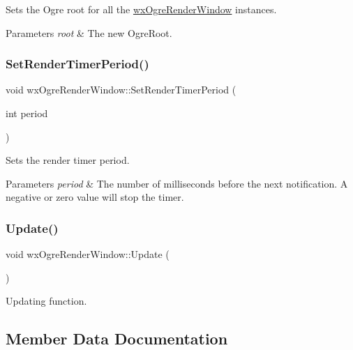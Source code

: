 Sets the Ogre root for all the \mbox{\hyperlink{classwx_ogre_render_window}{wx\+Ogre\+Render\+Window}} instances. 
\begin{DoxyParams}{Parameters}
{\em root} & The new Ogre\+Root. \\
\hline
\end{DoxyParams}
\mbox{\label{classwx_ogre_render_window_ad2588b1d44ae75bca36ede1303ff914f}} 
\subsubsection{\texorpdfstring{Set\+Render\+Timer\+Period()}{SetRenderTimerPeriod()}}
{\footnotesize\ttfamily void wx\+Ogre\+Render\+Window\+::\+Set\+Render\+Timer\+Period (\begin{DoxyParamCaption}\item[{int}]{period }\end{DoxyParamCaption})}

Sets the render timer period. 
\begin{DoxyParams}{Parameters}
{\em period} & The number of milliseconds before the next notification. A negative or zero value will stop the timer. \\
\hline
\end{DoxyParams}
\mbox{\label{classwx_ogre_render_window_a00c18e5b03975a630b512ebf0d4f0764}} 
\subsubsection{\texorpdfstring{Update()}{Update()}}
{\footnotesize\ttfamily void wx\+Ogre\+Render\+Window\+::\+Update (\begin{DoxyParamCaption}{ }\end{DoxyParamCaption})\hspace{0.3cm}{\ttfamily [virtual]}}

Updating function. 

\subsection{Member Data Documentation}
\mbox{\label{classwx_ogre_render_window_ac118411b88d49b1df4218d003520f22d}} 
